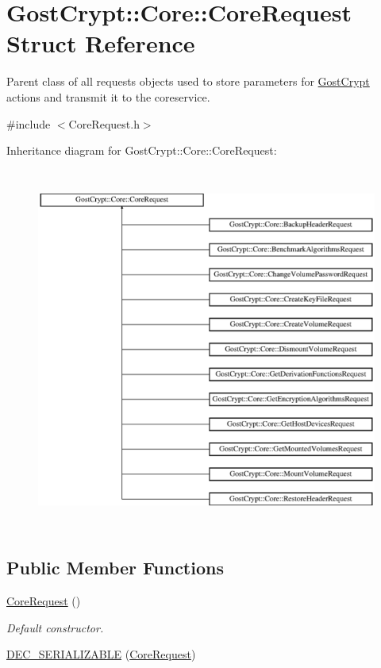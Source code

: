 \hypertarget{struct_gost_crypt_1_1_core_1_1_core_request}{}\section{Gost\+Crypt\+:\+:Core\+:\+:Core\+Request Struct Reference}
\label{struct_gost_crypt_1_1_core_1_1_core_request}


Parent class of all requests objects used to store parameters for \hyperlink{namespace_gost_crypt}{Gost\+Crypt} actions and transmit it to the coreservice.  




{\ttfamily \#include $<$Core\+Request.\+h$>$}

Inheritance diagram for Gost\+Crypt\+:\+:Core\+:\+:Core\+Request\+:\begin{figure}[H]
\begin{center}
\leavevmode
\includegraphics[height=12.000000cm]{struct_gost_crypt_1_1_core_1_1_core_request}
\end{center}
\end{figure}
\subsection*{Public Member Functions}
\begin{DoxyCompactItemize}
\item 
\hyperlink{struct_gost_crypt_1_1_core_1_1_core_request_a3cbc4ff535bca080f06baf400336c8af}{Core\+Request} ()
\begin{DoxyCompactList}\small\item\em Default constructor. \end{DoxyCompactList}\item 
\hyperlink{struct_gost_crypt_1_1_core_1_1_core_request_a8f8c6795186e7e2f056c8fd20ca5f30c}{D\+E\+C\+\_\+\+S\+E\+R\+I\+A\+L\+I\+Z\+A\+B\+LE} (\hyperlink{struct_gost_crypt_1_1_core_1_1_core_request}{Core\+Request})
\end{DoxyCompactItemize}
